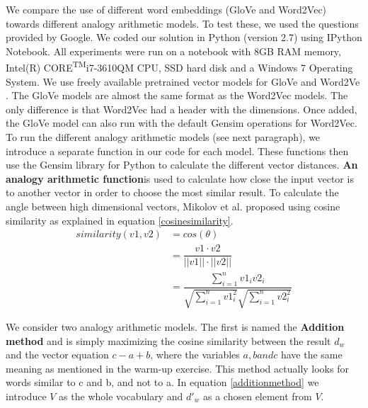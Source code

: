We compare the use of different word embeddings (GloVe and Word2Vec) towards different analogy arithmetic models\cite{marekreiblog}. To test these, we used the questions provided by Google\cite{word2vecquestionwords}.
\newline
\newline
We coded our solution in Python (version 2.7) using IPython Notebook. All experiments were run on a notebook with 8GB RAM memory, Intel(R) CORE\textsuperscript{TM}i7-3610QM CPU, SSD hard disk and a Windows 7 Operating System.
\newline
\newline
We use freely available pretrained vector models for GloVe \cite{glovedata} and Word2Ve \cite{word2vecdata}. The GloVe models are almost the same format as the Word2Vec models. The only difference is that Word2Vec had a header with the dimensions. Once added, the GloVe model can also run with the default Gensim operations for Word2Vec.
\newline
\newline
To run the different analogy arithmetic models (see next paragraph), we introduce a separate function in our code for each model. These functions then use the Gensim library for Python \cite{gensim} to calculate the different vector distances.
\newline
\textbf{An analogy arithmetic function}is used to calculate how close the input vector is to another vector in order to choose the most similar result. To calculate the angle between high dimensional vectors, Mikolov et al. \cite{mikolov} proposed using cosine similarity as explained in equation \ref{cosinesimilarity}. 
\begin{equation}
\begin{split}
\label{cosinesimilarity}
similarity(v1, v2) &= cos(\theta) \\&= \dfrac{v1 \cdot v2}{||v1|| \cdot ||v2||}  \\&= \dfrac{\sum_{i=1}^{n}v1_i v2_i}{\sqrt{\sum_{i=1}^{n}v1_i^2} \sqrt{\sum_{i=1}^{n} v2_i^2}}
\end{split}
\end{equation}

\leavevmode
\newline
We consider two analogy arithmetic models. The first is named the \textbf{Addition method} and is simply maximizing the cosine similarity between the result $d_w$ and the vector equation $c-a+b$, where the variables $a, b and c$ have the same meaning as mentioned in the warm-up exercise. This method actually looks for words similar to c and b, and not to a. In equation \ref{additionmethod} we introduce $V$ as the whole vocabulary and $d'_w$ as a chosen element from $V$.

